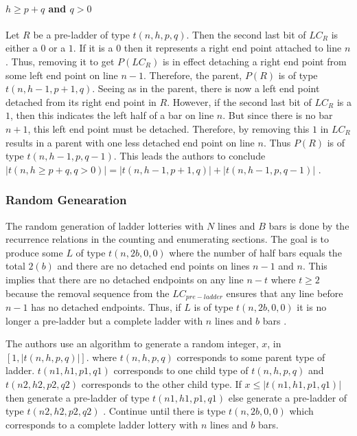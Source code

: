 \paragraph{ $h\geq p+q$ and $q>0$}
Let $R$ be a pre-ladder of type $t(n,h,p,q)$. Then 
the second last bit of $LC_{R}$ is either a $0$ 
or a $1$. If it is a $0$ then it represents a 
right end point attached to line $n$. Thus, 
removing it to get $P(LC_{R})$ is in effect 
detaching a right end point from some left end point 
on line $n-1$. Therefore, the parent, $P(R)$ is 
of type $t(n,h-1,p+1,q)$. Seeing as in the parent, 
there is now a left end point detached from its right 
end point in $R$. However, if the second last bit 
of $LC_{R}$ is a $1$, then this indicates the left 
half of a bar on line $n$. But since there is no 
bar $n+1$, this left end point must be detached. 
Therefore, by removing this $1$ in $LC_{R}$ results 
in a parent with one less detached end point on line $n$.
Thus $P(R)$ is of type $t(n,h-1,p,q-1)$. This leads the 
authors to conclude $|t(n,h\geq p+q,q>0)|=|t(n,h-1,p+1,q)|+|t(n,h-1,p,q-1)|$ \cite{A6}.
\subsubsection{Random Genearation}
The random generation of ladder lotteries with $N$ lines and
$B$ bars is done by the recurrence relations in the counting 
and enumerating sections. The goal is to produce 
some $L$ of type $t(n,2b,0,0)$ where the number of half 
bars equals the total $2(b)$ and there are no detached 
end points on lines $n-1$ and $n$. This implies that there 
are no detached endpoints on any line $n-t$ where $t\geq2$
because the removal sequence from the $LC_{pre-ladder}$
ensures that any line before $n-1$ has no detached endpoints. Thus, 
if $L$ is of type $t(n,2b,0,0)$ it is no longer a pre-ladder 
but a complete ladder with $n$ lines and $b$ bars \cite{A6}.\par 
The authors use an algorithm to generate a random integer, $x$,
in $[1,|t(n,h,p,q)|]$. where $t(n,h,p,q)$ corresponds to some 
parent type of ladder. $t(n1,h1,p1,q1)$ corresponds to one 
child type of $t(n,h,p,q)$ and $t(n2,h2,p2,q2)$ corresponds 
to the other child type. If $x\leq|t(n1,h1,p1,q1)|$ then generate 
a pre-ladder of type $t(n1,h1,p1,q1)$ else generate a pre-ladder 
of type $t(n2,h2,p2,q2)$ \cite{A6}. Continue until there is type $t(n,2b,0,0)$
which corresponds to a complete ladder lottery with $n$ lines and $b$ bars.